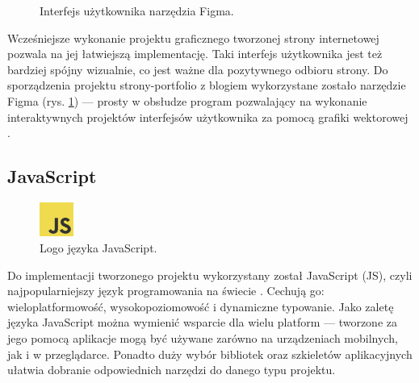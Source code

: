 \documentclass[12pt]{article}
\numberwithin{figure}{section}
\begin{document}
\begin{sloppypar}
\begin{figure}[H] 
    \centering
   \caption{Interfejs użytkownika narzędzia Figma.}
   \label{fig:figma-1.jpg}
\end{figure}

Wcześniejsze wykonanie projektu graficznego tworzonej strony internetowej pozwala na jej łatwiejszą implementację. Taki interfejs użytkownika jest też bardziej spójny wizualnie, co jest ważne dla pozytywnego odbioru strony. Do sporządzenia projektu strony-portfolio z blogiem wykorzystane zostało narzędzie Figma (rys. \ref{fig:figma-1.jpg}) --- prosty w obsłudze program pozwalający na wykonanie interaktywnych projektów interfejsów użytkownika za pomocą grafiki wektorowej \cite{figma}. 


\subsection*{JavaScript}

\begin{figure}[H] 
    \centering
        \includegraphics[width=0.1\textwidth]{images/js-logo.png}
   \caption{Logo języka JavaScript.}
\end{figure}

Do implementacji tworzonego projektu wykorzystany został \linebreak JavaScript (JS), czyli najpopularniejszy język programowania na świecie \cite{js}. Cechują go: wieloplatformowość, wysokopoziomowość i dynamiczne typowanie. Jako zaletę języka JavaScript można wymienić wsparcie dla wielu platform --- tworzone za jego pomocą aplikacje mogą być używane zarówno na urządzeniach mobilnych, jak i w przeglądarce. Ponadto duży wybór bibliotek oraz szkieletów aplikacyjnych ułatwia dobranie odpowiednich narzędzi do danego typu projektu.


\end{sloppypar}
\end{document}
